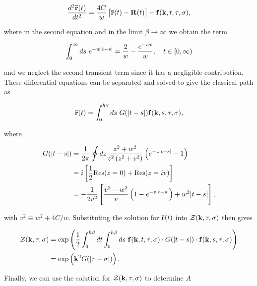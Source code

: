 \begin{equation}
    \frac{d^2 \vb{\bar{r}}(t)}{dt^2} = \frac{4C}{w} \left[\vb{\bar{r}}(t) - \vb{R}(t)\right] - \vb{f}(\vb{k}, t, \tau, \sigma) ,
\end{equation}

where in the second equation and in the limit $\beta \to \infty$ we obtain the term

\begin{equation}
    \int^\infty_0 ds\ e^{-w\abs{t-s}} = \frac{2}{w} - \frac{e^{-wt}}{w}, \quad t \in [0, \infty)
\end{equation}

and we neglect the second transient term since it has a negligible contribution. These differential equations can be separated and solved to give the classical path as

\begin{equation}
    \vb{\bar{r}}(t) = \int^{\hbar\beta}_0 ds\ G(\abs{t-s}) \vb{f}(\vb{k}, s, \tau, \sigma),
\end{equation}

where

\begin{equation}
\begin{aligned}
    G(\abs{t-s}) &= \frac{1}{2\pi} \oint dz \frac{z^2 + w^2}{z^2 \left(z^2 + v^2\right)} \left(e^{-z\abs{t-s}}-1\right) \\
    &= i \left[\frac{1}{2} \mathrm{Res}(z=0) + \mathrm{Res}(z = iv) \right] \\
    &= -\frac{1}{2v^2} \left[ \frac{v^2-w^2}{v}\left(1 - e^{-v\abs{t-s}}\right) + w^2 \abs{t-s} \right],
\end{aligned}
\end{equation}

with $v^2 \equiv w^2 + 4C/w$. Substituting the solution for $\vb{\bar{r}}(t)$ into $\mathcal{Z}(\vb{k}, \tau, \sigma)$ then gives

\begin{equation}
    \begin{aligned}
        \mathcal{Z}(\vb{k}, \tau, \sigma) &= \exp\left( \frac{1}{2} \int^{\hbar\beta}_0 dt \int^{\hbar\beta}_0 ds\ \vb{f}(\vb{k}, t, \tau, \sigma) \cdot  G(\abs{t-s}) \cdot \vb{f}(\vb{k}, s, \tau, \sigma) \right) \\
        &= \exp \left( \vb{k}^2 G(\abs{\tau - \sigma}) \right).
    \end{aligned}
\end{equation}

Finally, we can use the solution for $\mathcal{Z}(\vb{k}, \tau, \sigma)$ to determine $A$

